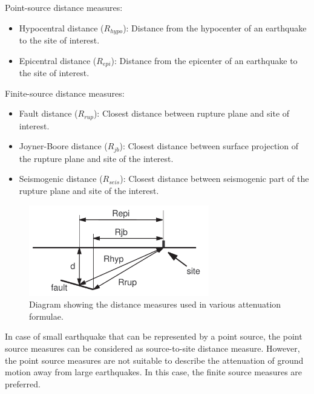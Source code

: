 Point-source distance measures:
\begin{itemize}
\item Hypocentral distance ($R_{hypo}$): Distance from the hypocenter of an earthquake to the site of interest.
\item Epicentral distance ($R_{epi}$): Distance from the epicenter of an earthquake to the site of interest.
\end{itemize}

Finite-source distance measures:
\begin{itemize}
\item Fault distance ($R_{rup}$): Closest distance between rupture plane and site of interest.
\item Joyner-Boore distance ($R_{jb}$): Closest distance between surface projection of the rupture plane and site of the interest.
\item Seismogenic distance ($R_{seis}$): Closest distance between seismogenic part of the rupture plane and site of the interest.
\end{itemize}
\begin{figure}[htp]
 \centering {}
  
  
\includegraphics[width=0.7\textwidth]{diags/fig-hattn-distance}
\caption{Diagram showing the distance measures used in various
  attenuation formulae.}
  \label{fig:attn-distances}
\end{figure}
In case of small earthquake that can be represented by a point
source, the point source measures can be considered as
source-to-site distance measure. However, the point source measures
are not suitable to describe the attenuation of ground motion away
from large earthquakes. In this case, the finite source measures are
preferred.

